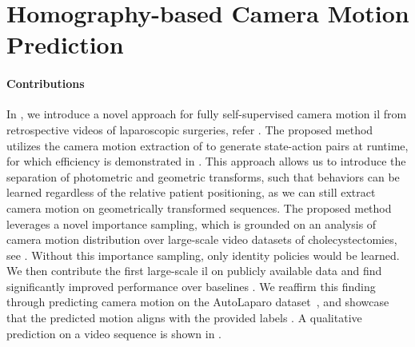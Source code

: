 \section{Homography-based Camera Motion Prediction}
\label{con:sec:hom_pred}
\paragraph{Contributions} In , we introduce a novel approach for fully self-supervised camera motion \gls{il} from retrospective videos of laparoscopic surgeries, refer . The proposed method utilizes the camera motion extraction of  to generate state-action pairs at runtime, for which efficiency is demonstrated in . This approach allows us to introduce the separation of photometric and geometric transforms, such that behaviors can be learned regardless of the relative patient positioning, as we can still extract camera motion on geometrically transformed sequences. The proposed method leverages a novel importance sampling, which is grounded on an analysis of camera motion distribution over large-scale video datasets of cholecystectomies, see . Without this importance sampling, only identity policies would be learned. We then contribute the first large-scale \gls{il} on publicly available data and find significantly improved performance over baselines . We reaffirm this finding through predicting camera motion on the AutoLaparo dataset~\cite{wang2022autolaparo}, and showcase that the predicted motion aligns with the provided labels . A qualitative prediction on a video sequence is shown in .

